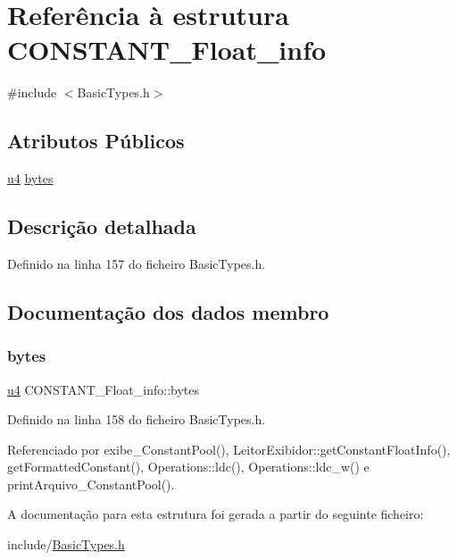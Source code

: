 \hypertarget{structCONSTANT__Float__info}{}\section{Referência à estrutura C\+O\+N\+S\+T\+A\+N\+T\+\_\+\+Float\+\_\+info}
\label{structCONSTANT__Float__info}


{\ttfamily \#include $<$Basic\+Types.\+h$>$}

\subsection*{Atributos Públicos}
\begin{DoxyCompactItemize}
\item 
\hyperlink{BasicTypes_8h_ae5be1f726785414dd1b77d60df074c9d}{u4} \hyperlink{structCONSTANT__Float__info_a9ebd8fbd25f329288cbe934c889de72e}{bytes}
\end{DoxyCompactItemize}


\subsection{Descrição detalhada}


Definido na linha 157 do ficheiro Basic\+Types.\+h.



\subsection{Documentação dos dados membro}
\mbox{\label{structCONSTANT__Float__info_a9ebd8fbd25f329288cbe934c889de72e}} 
\subsubsection{\texorpdfstring{bytes}{bytes}}
{\footnotesize\ttfamily \hyperlink{BasicTypes_8h_ae5be1f726785414dd1b77d60df074c9d}{u4} C\+O\+N\+S\+T\+A\+N\+T\+\_\+\+Float\+\_\+info\+::bytes}



Definido na linha 158 do ficheiro Basic\+Types.\+h.



Referenciado por exibe\+\_\+\+Constant\+Pool(), Leitor\+Exibidor\+::get\+Constant\+Float\+Info(), get\+Formatted\+Constant(), Operations\+::ldc(), Operations\+::ldc\+\_\+w() e print\+Arquivo\+\_\+\+Constant\+Pool().



A documentação para esta estrutura foi gerada a partir do seguinte ficheiro\+:\begin{DoxyCompactItemize}
\item 
include/\hyperlink{BasicTypes_8h}{Basic\+Types.\+h}\end{DoxyCompactItemize}
